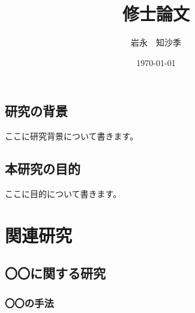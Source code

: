 \documentclass[a4paper]{ltjsreport}
\title{修士論文}
\author{岩永　知沙季}
\date{\today}
\begin{document}
\maketitle

\tableofcontents %



\section{研究の背景}
ここに研究背景について書きます。

\section{本研究の目的}
ここに目的について書きます。

\chapter{関連研究}
\section{〇〇に関する研究}
\subsection{〇〇の手法}
\end{document}
